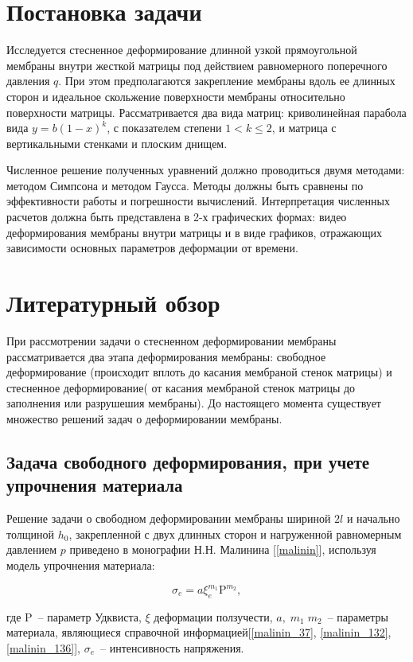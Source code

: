 \section{Постановка задачи}
Исследуется стесненное деформирование длинной узкой прямоугольной мембраны внутри жесткой матрицы под действием равномерного поперечного 
давления $q$. При этом предполагаются закрепление мембраны вдоль ее длинных сторон и идеальное скольжение поверхности мембраны относительно поверхности матрицы.
Рассматривается два вида матриц: криволинейная парабола вида $y = b(1-x)^k$, с показателем степени $1<k \leqslant 2$, и матрица с вертикальными стенками и плоским днищем.

Численное решение полученных уравнений должно проводиться двумя методами: методом Симпсона и методом Гаусса. Методы должны быть 
сравнены по эффективности работы и погрешности вычислений.
Интерпретация численных расчетов должна быть представлена в 2-х графических формах: видео деформирования мембраны внутри матрицы и 
в виде графиков, отражающих зависимости основных параметров деформации от времени.

\section{Литературный обзор}

При рассмотрении задачи о стесненном деформировании мембраны рассматривается 
два этапа деформирования мембраны: свободное деформирование (происходит вплоть до касания мембраной стенок матрицы) и стесненное деформирование( от касания мембраной стенок матрицы до заполнения или разрушешия мембраны). До настоящего момента существует множество решений задач о деформировании мембраны.

\subsection{Задача свободного деформирования, при учете упрочнения материала}
Решение задачи о свободном деформировании мембраны шириной $2l$ и начально толщиной $h_0$, закрепленной с двух длинных сторон и нагруженной равномерным давлением $p$ приведено в монографии Н.Н. Малинина [\ref{malinin}], используя модель упрочнения материала:

\begin{equation}
	\sigma_e = a\xi_e^{m_1}\text{P}^{m_2},
\end{equation}

где P~-- параметр Удквиста, $\xi$ деформации ползучести, $a, \; m_1\; m_2$~-- параметры материала, 
являющиеся справочной информацией[\ref{malinin_37}, \ref{malinin_132}, \ref{malinin_136}], $\sigma_e$~--
интенсивность напряжения. 

